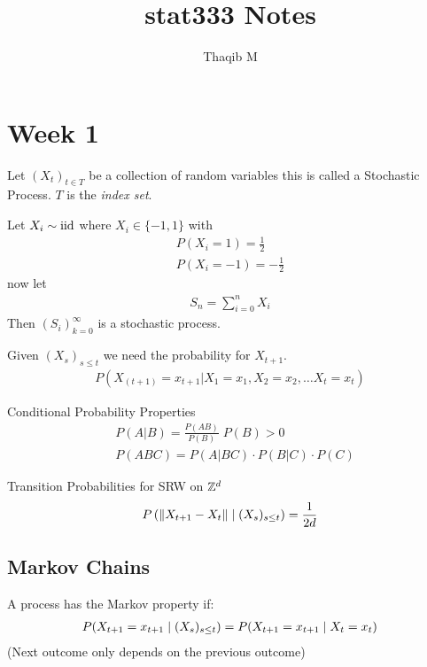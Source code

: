 \documentclass[12pt,a4paper]{article}
\author{Thaqib M}
\title{stat333 Notes}
\begin{document}
\maketitle
\newpage
\section{Week 1}
\begin{defn}
Let $(X_t)_{t\in T}$ be a collection of random variables this is called a Stochastic Process. $T$ is the \textit{index set}. 
\end{defn}
\begin{example}
Let $X_i\sim \mathrm{iid}$ where $X_i \in \{-1,1\}$ with 
\begin{align*}
P(X_i = 1) = \frac{1}{2}\\
P(X_i = -1) = -\frac{1}{2}
\end{align*}
now let 
\begin{align*}
S_n = \sum_{i=0}^n X_i
\end{align*}
Then $(S_i)_{k=0}^\infty$ is a stochastic process.  
\end{example}

\begin{defn}
Given $(X_s)_{s \leq t}$ we need the probability for $X_{t+1}$.
\begin{align*}
P(X_{(t+1)} = x_{t+1} \vert X_1 = x_1 , X_2 = x_2, \ldots X_t = x_t)
\end{align*}
\end{defn}


\begin{note}{Conditional Probability Properties}
\begin{align*}
&P(A | B) = \frac{P(AB)}{P(B)} \; P(B) > 0\\
&P(ABC) = P(A|BC) \cdot P(B|C) \cdot P(C)
\end{align*}
\end{note}

\begin{example}{Transition Probabilities for SRW on $\mathbb{Z}^d$}
\begin{align*}
P\left(\norm{X_{t+1} - X_{t}} \;\vert\; (X_{s})_{s \leq t} \right) = \frac{1}{2d} 
\end{align*}
\end{example}
\newpage
\subsection{Markov Chains}
\begin{defn}
\label{markovprop}
A process has the Markov property if:
\begin{align*}
P(X_{t+1}= x_{t+1} \;\vert\; (X_{s})_{s\leq t}) = P(X_{t+1} = x_{t+1} \;\vert\; X_{t} = x_t)
\end{align*}
(Next outcome only depends on the previous outcome)
\end{defn}
\end{document}
